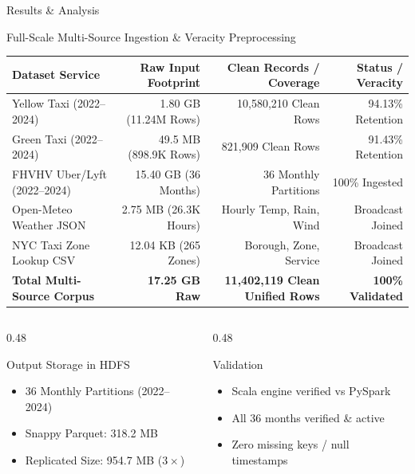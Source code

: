 \documentclass[aspectratio=169]{beamer}
\begin{document}
\begin{frame}{Results \& Analysis}
  \begin{block}{Full-Scale Multi-Source Ingestion \& Veracity Preprocessing}
    \centering
    \tiny
    \setlength{\tabcolsep}{3pt}
    \begin{tabular}{l r r r}
      \toprule
      \textbf{Dataset Service} & \textbf{Raw Input Footprint} & \textbf{Clean Records / Coverage} & \textbf{Status / Veracity} \\
      \midrule
      Yellow Taxi (2022--2024)     & 1.80 GB (11.24M Rows) & 10,580,210 Clean Rows  & 94.13\% Retention \\
      Green Taxi (2022--2024)      & 49.5 MB (898.9K Rows) & 821,909 Clean Rows     & 91.43\% Retention \\
      FHVHV Uber/Lyft (2022--2024) & 15.40 GB (36 Months)  & 36 Monthly Partitions  & 100\% Ingested \\
      Open-Meteo Weather JSON      & 2.75 MB (26.3K Hours) & Hourly Temp, Rain, Wind & Broadcast Joined \\
      NYC Taxi Zone Lookup CSV     & 12.04 KB (265 Zones)  & Borough, Zone, Service  & Broadcast Joined \\
      \midrule
      \textbf{Total Multi-Source Corpus} & \textbf{17.25 GB Raw} & \textbf{11,402,119 Clean Unified Rows} & \textbf{100\% Validated} \\
      \bottomrule
    \end{tabular}
  \end{block}
  \vspace{1pt}
  \begin{columns}[T]
    \begin{column}{0.48\textwidth}
      \begin{block}{Output Storage in HDFS}
        \scriptsize
        \begin{itemize}
          \item 36 Monthly Partitions (2022--2024)
          \item Snappy Parquet: 318.2 MB
          \item Replicated Size: 954.7 MB ($3\times$)
        \end{itemize}
      \end{block}
    \end{column}
    \begin{column}{0.48\textwidth}
      \begin{block}{Validation}
        \scriptsize
        \begin{itemize}
          \item Scala engine verified vs PySpark
          \item All 36 months verified & active
          \item Zero missing keys / null timestamps
        \end{itemize}
      \end{block}
    \end{column}
  \end{columns}
\end{frame}
\end{document}
